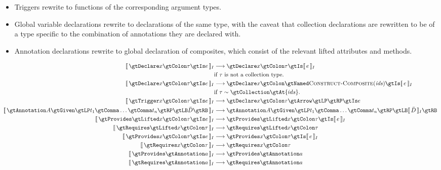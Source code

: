 \documentclass{article}
\begin{document}
    \begin{itemize}
        \item Triggers rewrite to functions of the corresponding argument types.
        \item Global variable declarations rewrite to declarations of the same type, with the caveat
            that collection declarations are rewritten to be of a type specific to the combination
            of annotations they are declared with.
        \item Annotation declarations rewrite to global declaration of composites, which consist of
            the relevant lifted attributes and methods.
    \end{itemize}
%
    \begin{adjustwidth}{-0.5in}{-0.5in}\begin{align*}
        \eqI{\gtDeclare x \gtColon \tau \gtIs e}
            {\gtDeclare x \gtColon \tau \gtIs \intI{e}}
            {if $\tau$ is not a collection type.} \\
        \eqI{\gtDeclare x \gtColon \tau \gtIs e}
            {\gtDeclare x \gtColon \gtNamed \ConstructComposite{ids} \gtIs \intI{e}}
            {if $\tau \sim \gtCollection \gtAt \{ids\}$.} \\
        \eqI{\gtTrigger x \gtColon \tau \gtIs e}
            {\gtDeclare x \gtColon \tau \gtArrow \gtLP \gtRP \gtIs e}
            {} \\
        \eqI{\gtAnnotation A \gtGiven \gtLP t_1 \gtComma \ldots \gtComma t_n \gtRP \gtLB \bar{D} \gtRB}
            {\gtAnnotation A \gtGiven \gtLP t_1 \gtComma \ldots \gtComma t_n \gtRP \gtLB \intI{\bar{D}} \gtRB}{} \\
        \eqI{\gtProvides \gtLifted x \gtColon \tau \gtIs e}
            {\gtProvides \gtLifted x \gtColon \tau \gtIs \intI{e}}{} \\
        \eqI{\gtRequires \gtLifted x \gtColon \tau}
            {\gtRequires \gtLifted x \gtColon \tau}{} \\
        \eqI{\gtProvides x \gtColon \tau \gtIs e}
            {\gtProvides x \gtColon \tau \gtIs \intI{e}}{} \\
        \eqI{\gtRequires x \gtColon \tau}
            {\gtRequires x \gtColon \tau}{} \\
        \eqI{\gtProvides \gtAnnotation a}
            {\gtProvides \gtAnnotation a}{} \\
        \eqI{\gtRequires \gtAnnotation a}
            {\gtRequires \gtAnnotation a}{}
    \end{align*}\end{adjustwidth}
\end{document}
